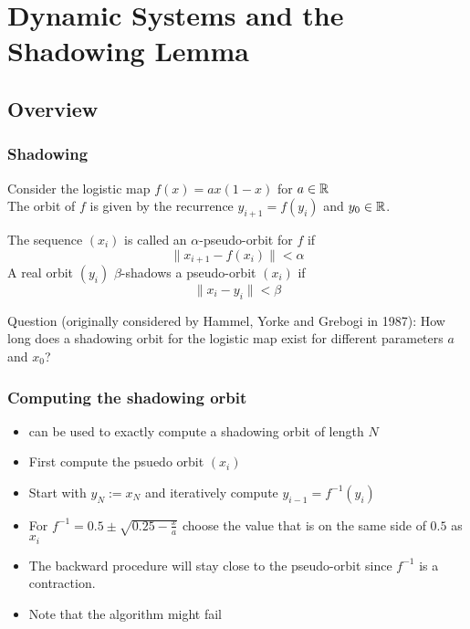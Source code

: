 \section{Dynamic Systems and the Shadowing Lemma}
\subsection{Overview}
\begin{frame}[<+->]
\frametitle{Shadowing}
Consider the logistic map $f(x) = a x  (1-x)$ for $a \in \mathbb{R}$ \\
The orbit of $f$ is given by the recurrence 
$y_{i+1} = f(y_i)$ and $y_0 \in \mathbb{R}$.
\pause
\begin{definition}
	The sequence $(x_i)$ is called an $\alpha$-pseudo-orbit for $f$ if 
	$$
	\| x_{i+1} - f(x_i) \| < \alpha
	$$ 
	A real orbit $(y_i)$ $\beta$-shadows a pseudo-orbit $(x_i)$ if 
	$$
	\| x_{i} - y_i \| < \beta
	$$ 
\end{definition}
\pause
Question (originally considered by Hammel, Yorke and Grebogi in 1987): How long does a shadowing orbit for the logistic map exist for different parameters $a$ and $x_0$?
\end{frame}
\begin{frame}[<+->]
\frametitle{Computing the shadowing orbit}
\begin{itemize}
\item \irram can be used to exactly compute a shadowing orbit of length $N$
\item First compute the psuedo orbit $(x_i)$
\item Start with $y_N := x_N$ and iteratively compute $y_{i-1} = f^{-1}(y_i)$
\item For $f^{-1} = 0.5 \pm \sqrt{0.25-\frac{x}{a}}$ choose the value that is on the same side of $0.5$ as $x_i$
\item The backward procedure will stay close to the pseudo-orbit since $f^{-1}$ is a contraction.
\item Note that the algorithm might fail
\end{itemize}
\end{frame}